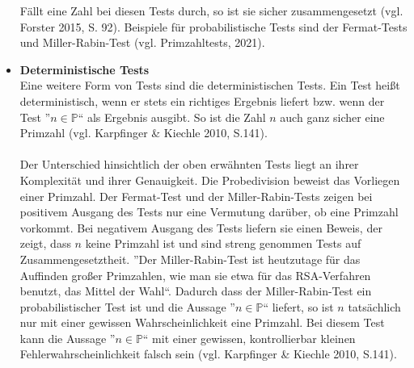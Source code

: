 \begin{itemize}
    Fällt eine Zahl bei diesen Tests durch, so ist sie sicher
    zusammengesetzt (vgl. Forster 2015, S. 92). Beispiele für
    probabilistische Tests sind der Fermat-Tests und
    Miller-Rabin-Test (vgl. Primzahltests, 2021).
 \item \textbf{Deterministische Tests}\\
    Eine weitere Form von Tests sind die deterministischen
    Tests. Ein Test heißt deterministisch, wenn er stets ein
    richtiges Ergebnis liefert bzw. wenn der Test
    ''$n \in\mathbb{P}$`` als Ergebnis ausgibt. So ist die
    Zahl $n$ auch ganz sicher eine Primzahl
    (vgl. Karpfinger \& Kiechle 2010, S.141).\\\\
    Der Unterschied hinsichtlich der oben erwähnten Tests
    liegt an ihrer Komplexität und ihrer Genauigkeit.
    Die Probedivision beweist das Vorliegen einer Primzahl.
    Der Fermat-Test und der Miller-Rabin-Tests zeigen bei
    positivem Ausgang des Tests nur eine Vermutung darüber,
    ob eine Primzahl vorkommt. Bei negativem Ausgang des
    Tests liefern sie einen Beweis, der zeigt, dass $n$
    keine Primzahl ist und sind streng genommen Tests auf
    Zusammengesetztheit. ''Der Miller-Rabin-Test ist
    heutzutage für das Auffinden großer Primzahlen, wie man
    sie etwa für das RSA-Verfahren benutzt, das Mittel der 
    Wahl``. Dadurch dass der Miller-Rabin-Test ein
    probabilistischer Test ist und die Aussage
    ''$n \in\mathbb{P}$`` liefert, so ist $n$ tatsächlich
    nur mit einer gewissen Wahrscheinlichkeit eine Primzahl.
    Bei diesem Test kann die Aussage ''$n \in\mathbb{P}$``
    mit einer gewissen, kontrollierbar kleinen
    Fehlerwahrscheinlichkeit falsch sein
    (vgl. Karpfinger \& Kiechle 2010, S.141).
\end{itemize}
